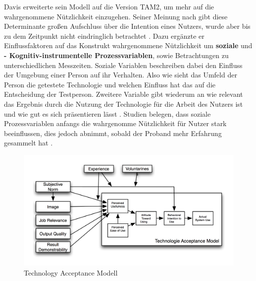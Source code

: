 Davis erweiterte sein Modell auf die Version TAM2, um mehr auf die wahrgenommene Nützlichkeit einzugehen. Seiner Meinung nach gibt diese Determinante großen Aufschluss über die Intention eines Nutzers, wurde aber bis zu dem Zeitpunkt nicht eindringlich betrachtet \cite{venkatesh_model_1996}. Dazu ergänzte er Einflussfaktoren auf das Konstrukt wahrgenommene Nützlichkeit um \textbf{soziale} und \textbf{-	Kognitiv-instrumentelle Prozessvariablen}, sowie Betrachtungen zu unterschiedlichen Messzeiten. Soziale Variablen beschreiben dabei den Einfluss der Umgebung einer Person auf ihr Verhalten. Also wie sieht das Umfeld der Person die getestete Technologie und welchen Einfluss hat das auf die Entscheidung der Testperson. Zweitere Variable gibt wiederum an wie relevant das Ergebnis durch die Nutzung der Technologie für die Arbeit des Nutzers ist und wie gut es sich präsentieren lässt \cite{venkatesh_theoretical_2000}. Studien belegen, dass soziale Prozessvariablen anfangs die wahrgenomme Nützlichkeit für Nutzer stark beeinflussen, dies jedoch abnimmt, sobald der Proband mehr Erfahrung gesammelt hat \cite{galli_technologieakzeptanz_2016}.

\begin{figure}[h]
\begin{center}
\noindent\includegraphics[width=\linewidth,height=\textheight,keepaspectratio]{Resources/TAM.png}
\caption{Technology Acceptance Modell}
\end{center}
\end{figure}



